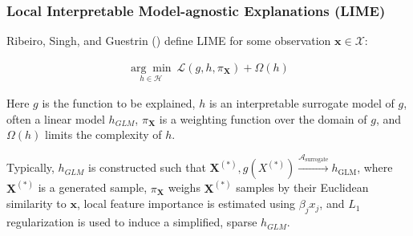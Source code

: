 \documentclass[11pt,aspectratio=169,hyperref={colorlinks}]{beamer}
\begin{document}
	\begin{frame}

		\frametitle{Local Interpretable Model-agnostic Explanations (LIME)}
		
		Ribeiro, Singh, and Guestrin (\citeyear{lime}) define LIME for some observation $\mathbf{x} \in \mathcal{X}$:
		
		\begin{equation*}
		\begin{aligned}
		\underset{h \in \mathcal{H}}{\arg\min}\:\mathcal{L}(g, h, \pi_{\mathbf{X}}) + \Omega(h)
		\end{aligned}
		\end{equation*}
		
		Here $g$ is the function to be explained, $h$ is an interpretable surrogate model of $g$, often a linear model $h_{GLM}$, $\pi_{\mathbf{X}}$ is a weighting function over the domain of $g$, and $\Omega(h)$ limits the complexity of $h$.
		
		\vspace{5pt}
		
		Typically, $h_{GLM}$ is constructed such that $\mathbf{X}^{(*)}, g({X}^{(*)}) \xrightarrow{\mathcal{A}_{\text{surrogate}}} h_{\text{GLM}}$, where $\mathbf{X}^{(*)}$ is a generated sample, $\pi_{\mathbf{X}}$ weighs $\mathbf{X}^{(*)}$ samples by their Euclidean similarity to $\mathbf{x}$, local feature importance is estimated using $\beta_j x_j$, and $L_1$ regularization is used to induce a simplified, sparse $h_{GLM}$. 		


	\end{frame}
\end{document}
